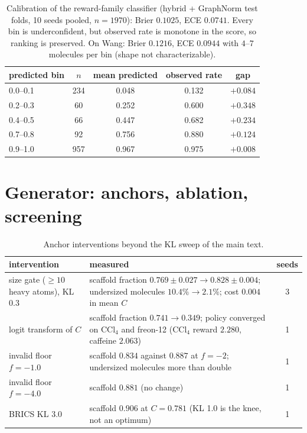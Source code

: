 \documentclass[10pt,letterpaper]{article}
\begin{document}
\begin{table}[!htbp]\centering
\caption{Calibration of the reward-family classifier (hybrid + GraphNorm test folds, 10 seeds pooled, $n=1970$): Brier $0.1025$, ECE $0.0741$. Every bin is underconfident, but observed rate is monotone in the score, so ranking is preserved. On Wang: Brier $0.1216$, ECE $0.0944$ with $4$--$7$ molecules per bin (shape not characterizable).}
\label{tab:s7}
\begin{tabular}{@{}lcccc@{}}\toprule
predicted bin & $n$ & mean predicted & observed rate & gap\\\midrule
0.0--0.1 & 234 & 0.048 & 0.132 & $+0.084$\\
0.2--0.3 & 60 & 0.252 & 0.600 & $+0.348$\\
0.4--0.5 & 66 & 0.447 & 0.682 & $+0.234$\\
0.7--0.8 & 92 & 0.756 & 0.880 & $+0.124$\\
0.9--1.0 & 957 & 0.967 & 0.975 & $+0.008$\\\bottomrule
\end{tabular}
\end{table}

\FloatBarrier
\section{Generator: anchors, ablation, screening}
\begin{table}[!htbp]\centering\small
\caption{Anchor interventions beyond the KL sweep of the main text.}
\label{tab:s3}
\begin{tabular}{@{}p{3.6cm}p{9.3cm}c@{}}\toprule
intervention & measured & seeds\\\midrule
size gate ($\ge10$ heavy atoms), KL 0.3 & scaffold fraction $0.769\pm0.027\to0.828\pm0.004$; undersized molecules $10.4\%\to2.1\%$; cost $0.004$ in mean $C$ & 3\\
logit transform of $C$ & scaffold fraction $0.741\to0.349$; policy converged on CCl$_4$ and freon-12 (CCl$_4$ reward $2.280$, caffeine $2.063$) & 1\\
invalid floor $f=-1.0$ & scaffold $0.834$ against $0.887$ at $f=-2$; undersized molecules more than double & 1\\
invalid floor $f=-4.0$ & scaffold $0.881$ (no change) & 1\\
BRICS KL 3.0 & scaffold $0.906$ at $C=0.781$ (KL 1.0 is the knee, not an optimum) & 1\\\bottomrule
\end{tabular}
\end{table}
\end{document}
